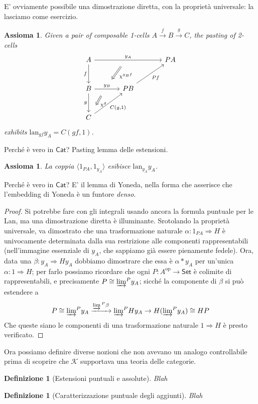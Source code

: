 \documentclass[11pt]{article}
\def\Cat{\mathsf{Cat}}
\def\Set{\mathsf{Set}}
\def\xto#1{\xrightarrow{#1}}
\def\To{\Rightarrow}
\def\opp{\mathrm{op}}
\def\lan{\mathrm{lan}}
\theoremstyle{reference}
\newtheorem{definition}[theorem]{Definizione}
\newtheorem{axiom}[theorem]{Assioma}
\begin{document}
E' ovviamente possibile una dimostrazione diretta, con la proprietà universale: la lasciamo come esercizio.
\begin{axiom}
Given a pair of composable 1-cells $A \xto{f} B\xto{g} C$, the
pasting of 2-cells
$$ \begin{tikzcd}[column sep=large, row sep=large] A\ar[d, "f"']\ar[rr, "y_A"{name=yonA}] && P A\\ B \ar[r, "y_B"{name=yonB}]\ar[d, "g"'] & P B\ar[ur, "P f"']\\ C\ar[ur, "{C(g,1)}"'] \ar[from=yonA, to=yonB, shorten >=2mm, shorten <=4mm, Rightarrow, "\chi^{y_B f}"] \ar[from=yonB, shorten >=4mm, shorten <=4mm, Rightarrow, "\chi^g"] \end{tikzcd} $$
exhibits $\lan_{gf}y_A = C(gf,1)$.
\end{axiom}
Perché è vero in \(\Cat\)? Pasting lemma delle estensioni.
\begin{axiom}
La coppia $\langle 1_{PA}, 1_{y_A} \rangle$ esibisce $\lan_{y_A}y_A$.
\end{axiom}
Perché è vero in \(\Cat\)? E' il lemma di Yoneda, nella forma che asserisce che l'embedding di Yoneda è un funtore \emph{denso}.
\begin{proof}
Si potrebbe fare con gli integrali usando ancora la formula
puntuale per le Lan, ma una dimostrazione diretta è
illuminante. Srotolando la proprietà universale, va
dimostrato che una trasformazione naturale $\alpha : 1_{PA}
\To H$ è univocamente determinata dalla sua restrizione alle
componenti rappresentabili (nell'immagine essenziale di
$y_A$, che sappiamo già essere pienamente fedele). Ora, data
una $\beta : y_A\To Hy_A$ dobbiamo dimostrare che essa è
$\alpha *y_A$ per un'unica $\alpha : 1\To H$; per farlo
possiamo ricordare che ogni $P : A^\opp\to \Set$ è colimite
di rappresentabili, e precisamente $P \cong
\varinjlim\!{}^Py_A$; sicché la componente di $\beta$ si può
estendere a
$$
P \cong \varinjlim\!{}^P y_A \xto{\varinjlim{}^P\beta} \varinjlim\!{}^P H y_A \to H(\varinjlim\!{}^P  y_A ) \cong HP
$$
Che queste siano le componenti di una trasformazione naturale $1 \To H$ è presto verificato.
\end{proof}


Ora possiamo definire diverse nozioni che non avevano un
analogo controllabile prima di scoprire che \(\mathcal K\)
supportava una teoria delle categorie.

\begin{definition}[Estensioni puntuali e assolute]
Blah 
\end{definition}
\begin{definition}[Caratterizzazione puntuale degli aggiunti]
Blah 
\end{definition}
\end{document}
